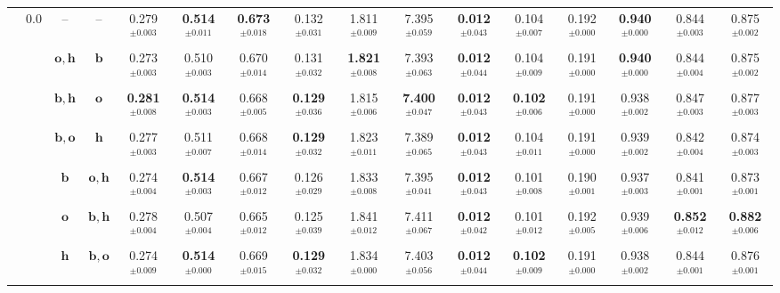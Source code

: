 \begin{table}
{\begin{tabular}{@{}cccccccccccccccc@{}}
        \multirow{7}{*}{\citep{li2023controllable}} & \multirow{7}{*}{$0.0$} & -- & --
        & {0.279$^{\pm0.003}$} & \textbf{0.514$^{\pm0.011}$} & \textbf{0.673$^{\pm0.018}$} & 0.132$^{\pm0.031}$ & 1.811$^{\pm0.009}$ & 7.395$^{\pm0.059}$ & \textbf{0.012$^{\pm0.043}$} & 0.104$^{\pm0.007}$ & 0.192$^{\pm0.000}$ & \textbf{0.940}$^{\pm0.000}$ & 0.844$^{\pm0.003}$ & 0.875$^{\pm0.002}$ \\
        & & $\boldsymbol{o}, \boldsymbol{h}$ & $\boldsymbol{b}$
        & 0.273$^{\pm0.003}$ & 0.510$^{\pm0.003}$ & 0.670$^{\pm0.014}$ & 0.131$^{\pm0.032}$ & \textbf{1.821$^{\pm0.008}$} & 7.393$^{\pm0.063}$ & \textbf{0.012$^{\pm0.044}$} & 0.104$^{\pm0.009}$ & 0.191$^{\pm0.000}$ & \textbf{0.940}$^{\pm0.000}$ & 0.844$^{\pm0.004}$ & 0.875$^{\pm0.002}$\\
        & & $\boldsymbol{b}, \boldsymbol{h}$ & $\boldsymbol{o}$
        & \textbf{0.281$^{\pm0.008}$} & \textbf{0.514$^{\pm0.003}$} & 0.668$^{\pm0.005}$ & \textbf{0.129$^{\pm0.036}$} & 1.815$^{\pm0.006}$ & \textbf{7.400}$^{\pm0.047}$ & \textbf{0.012$^{\pm0.043}$} & \textbf{0.102$^{\pm0.006}$} & 0.191$^{\pm0.000}$ & 0.938$^{\pm0.002}$ & {0.847$^{\pm0.003}$} & {0.877$^{\pm0.003}$} \\
        & &$\boldsymbol{b}, \boldsymbol{o}$ & $\boldsymbol{h}$
        & 0.277$^{\pm0.003}$ & 0.511$^{\pm0.007}$ & 0.668$^{\pm0.014}$ & \textbf{0.129$^{\pm0.032}$} & 1.823$^{\pm0.011}$ & 7.389$^{\pm0.065}$ & \textbf{0.012$^{\pm0.043}$} & 0.104$^{\pm0.011}$ & 0.191$^{\pm0.000}$ & 0.939$^{\pm0.002}$ & 0.842$^{\pm0.004}$ & 0.874$^{\pm0.003}$\\
        & & $\boldsymbol{b}$ & $\boldsymbol{o}, \boldsymbol{h}$ & 0.274$^{\pm0.004}$ & \textbf{0.514$^{\pm0.003}$} & 0.667$^{\pm0.012}$ & {0.126$^{\pm0.029}$} & 1.833$^{\pm0.008}$ & 7.395$^{\pm0.041}$ & \textbf{0.012$^{\pm0.043}$} & 0.101$^{\pm0.008}$ & {0.190$^{\pm0.001}$} & 0.937$^{\pm0.003}$ & 0.841$^{\pm0.001}$ & 0.873$^{\pm0.001}$ \\
        & & $\boldsymbol{o}$ & $\boldsymbol{b}, \boldsymbol{h}$
        & 0.278$^{\pm0.004}$ & 0.507$^{\pm0.004}$ & 0.665$^{\pm0.012}$ & {0.125$^{\pm0.039}$} & 1.841$^{\pm0.012}$ & 7.411$^{\pm0.067}$ & \textbf{0.012$^{\pm0.042}$} & {0.101$^{\pm0.012}$} & 0.192$^{\pm0.005}$ & 0.939$^{\pm0.006}$ & \textbf{0.852$^{\pm0.012}$} & \textbf{0.882$^{\pm0.006}$} \\
        & & $\boldsymbol{h}$ & $\boldsymbol{b}, \boldsymbol{o}$
        & 0.274$^{\pm0.009}$ & \textbf{0.514$^{\pm0.000}$} & 0.669$^{\pm0.015}$ & \textbf{0.129$^{\pm0.032}$} & 1.834$^{\pm0.000}$ & 7.403$^{\pm0.056}$ & \textbf{0.012$^{\pm0.044}$} & \textbf{0.102$^{\pm0.009}$} & 0.191$^{\pm0.000}$ & 0.938$^{\pm0.002}$ & 0.844$^{\pm0.001}$ & 0.876$^{\pm0.001}$ \\
        \bottomrule
    \end{tabular}}%
\end{table}





